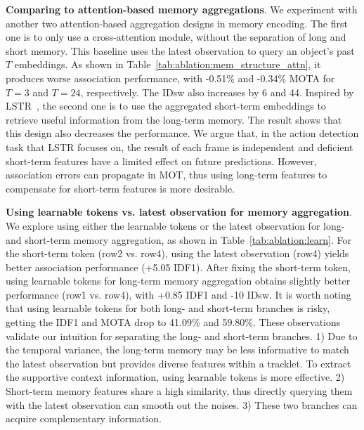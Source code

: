 \vspace{3pt} \noindent \textbf{Comparing to attention-based memory aggregations}.
We experiment with another two attention-based aggregation designs in memory encoding.
The first one is to only use a cross-attention module, without the separation of long and short memory.
This baseline uses the latest observation to query an object's past $T$ embeddings.
As shown in Table~\ref{tab:ablation:mem_structure_attn}, it produces worse association performance, with -0.51\% and -0.34\% MOTA for $T=3$ and $T=24$, respectively.
The IDsw also increases by 6 and 44.
Inspired by LSTR~\cite{xu2021long}, the second one is to use the aggregated short-term embeddings to retrieve useful information from the long-term memory. The result shows that this design also decreases the performance. We argue that, in the action detection task that LSTR focuses on, the result of each frame is independent and deficient short-term features have a limited effect on future predictions. However, association errors can propagate in MOT, thus using long-term features to compensate for short-term features is more desirable. 






\vspace{3pt} \noindent \textbf{Using learnable tokens vs. latest observation for memory aggregation}.
We explore using either the learnable tokens or the latest observation for long- and short-term memory aggregation, as shown in Table~\ref{tab:ablation:learn}.
For the short-term token (row2 vs. row4), using the latest observation (row4) yields better association performance (+5.05 IDF1).
After fixing the short-term token, using learnable tokens for long-term memory aggregation obtains slightly better performance (row1 vs. row4), with +0.85 IDF1 and -10 IDsw.
It is worth noting that using learnable tokens for both long- and short-term branches is risky, getting the IDF1 and MOTA drop to 41.09\% and 59.80\%.
These observations validate our intuition for separating the long- and short-term branches.
1) Due to the temporal variance, the long-term memory may be less informative to match the latest observation but provides diverse features within a tracklet.
To extract the supportive context information, using learnable tokens is more effective.
2) Short-term memory features share a high similarity, thus directly querying them with the latest observation can smooth out the noises.
3) These two branches can acquire complementary information.

